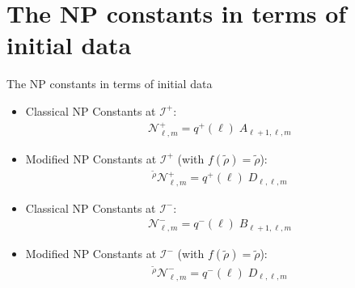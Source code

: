 \documentclass{beamer}
\theoremstyle{remark}
\theoremstyle{plain}
\theoremstyle{plain}
\begin{document}
\section{The NP constants in terms of initial data}
\begin{frame}{The NP constants in terms of initial data}
  \begin{itemize}
    \item Classical NP Constants at $\mathscr{I}^{+}$:
    \begin{align*}
      \mathcal{N}^{+}_{\ell,m} = q^{+}(\ell) \;A_{\ell+1,\ell,m}
    \end{align*}
    \item Modified NP Constants at $\mathscr{I}^{+}$ (with $f(\tilde{\rho})=\tilde{\rho}$):
    \begin{align*}
       {}^{\tilde{\rho}}\mathcal{N}^{+}_{\ell,m} = q^{+}(\ell) \;D_{\ell,\ell,m}
    \end{align*}
    \item Classical NP Constants at $\mathscr{I}^{-}$:
    \begin{align*}
      \mathcal{N}^{-}_{\ell,m} = q^{-}(\ell) \; B_{\ell+1,\ell,m}
    \end{align*}
    \item Modified NP Constants at $\mathscr{I}^{-}$ (with $f(\tilde{\rho})=\tilde{\rho}$):
    \begin{align*}
      {}^{\tilde{\rho}}\mathcal{N}^{-}_{\ell,m} = q^{-}(\ell) \;D_{\ell,\ell,m}
    \end{align*}
  \end{itemize}
\end{frame}
\end{document}
